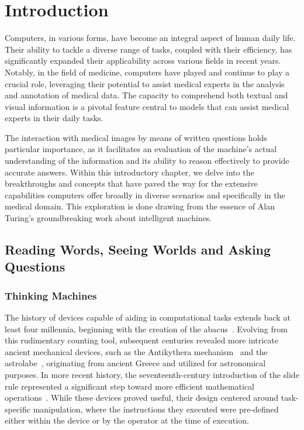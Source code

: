 \chapter{Introduction}

Computers, in various forms, have become an integral aspect of human daily life. Their ability to tackle a diverse range of tasks, coupled with their efficiency, has significantly expanded their applicability across various fields in recent years. Notably, in the field of medicine, computers have played and continue to play a crucial role, leveraging their potential to assist medical experts in the analysis and annotation of medical data. The capacity to comprehend both textual and visual information is a pivotal feature central to models that can assist medical experts in their daily tasks.

The interaction with medical images by means of written questions holds particular importance, as it facilitates an evaluation of the machine's actual understanding of the information and its ability to reason effectively to provide accurate answers. Within this introductory chapter, we delve into the breakthroughs and concepts that have paved the way for the extensive capabilities computers offer broadly in diverse scenarios and specifically in the medical domain. This exploration is done drawing from the essence of Alan Turing's groundbreaking work about intelligent machines. 

\newpage


\section{Reading Words, Seeing Worlds and Asking Questions}
\label{sec:reading_words_seeing_worlds}

\subsection{Thinking Machines}

The history of devices capable of aiding in computational tasks extends back at least four millennia, beginning with the creation of the abacus~\cite{flegg1989numbers}. Evolving from this rudimentary counting tool, subsequent centuries revealed more intricate ancient mechanical devices, such as the Antikythera mechanism~\cite{edmunds2014antikythera} and the astrolabe~\cite{north1974astrolabe}, originating from ancient Greece and utilized for astronomical purposes. In more recent history, the seventeenth-century introduction of the slide rule represented a significant step toward more efficient mathematical operations~\cite{stoll2006slide}. While these devices proved useful, their design centered around task-specific manipulation, where the instructions they executed were pre-defined either within the device or by the operator at the time of execution.

